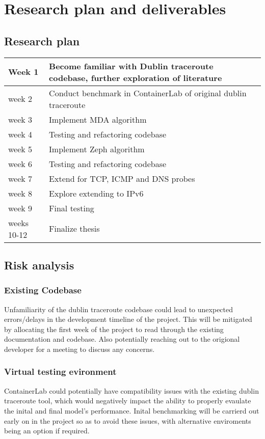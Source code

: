 \section{Research plan and deliverables}

\subsection{Research plan}
\begin{tabularx}{0.8\textwidth} { 
  | >{\raggedright\arraybackslash}X 
  | >{\centering\arraybackslash}X 
  | >{\raggedleft\arraybackslash}X | }
 \hline
 Week 1 & Become familiar with Dublin traceroute codebase, further exploration of literature  \\
 \hline
 week 2  & Conduct benchmark in ContainerLab of original dublin traceroute   \\
\hline
 week 3 & Implement MDA algorithm \\
 \hline
 week 4 & Testing and refactoring codebase \\
 \hline
 week 5 & Implement Zeph algorithm \\
 \hline
  week 6 & Testing and refactoring codebase \\
  \hline
  week 7 & Extend for TCP, ICMP and DNS probes \\
  \hline
  week 8 & Explore extending to IPv6\\
  \hline
  week 9 & Final testing\\
  \hline
  weeks 10-12 & Finalize thesis  \\
  \hline
\end{tabularx}

\subsection{Risk analysis}
\subsubsection{Existing Codebase}
Unfamiliarity of the dublin traceroute codebase could lead to unexpected errors/delays in the development timeline of the project. This will be mitigated by allocating the first week of the project to read through the existing documentation and codebase. Also potentially reaching out to the origional developer for a meeting to discuss any concerns.

\subsubsection{Virtual testing evironment}
ContainerLab could potentially have compatibility issues with the existing dublin traceroute tool, which would negatively impact the ability to properly evaulate the inital and final model's performance. Inital benchmarking will be carrierd out early on in the project so as to avoid these issues, with alternative enviroments being an option if required.

